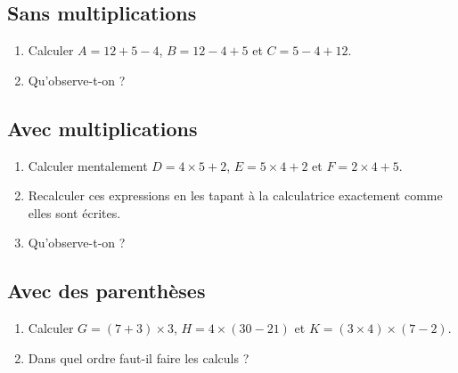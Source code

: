 
\subsection*{Sans multiplications}

\begin{enumerate}
    \item
        
Calculer \( A=12+5-4\), \( B=12-4+5\) et \( C=5-4+12\).
\item
    Qu'observe-t-on ?
\end{enumerate}

\subsection*{Avec multiplications}

\begin{enumerate}
    \item
        Calculer mentalement \( D=4\times 5+2\), \( E=5\times 4+2\) et \( F=2\times 4+5\).
    \item
        Recalculer ces expressions en les tapant à la calculatrice exactement comme elles sont écrites.
    \item
        Qu'observe-t-on ?
\end{enumerate}

\subsection*{Avec des parenthèses}

\begin{enumerate}
    \item
        Calculer \( G=(7+3)\times 3\), \( H=4\times (30-21)\) et \( K=(3\times 4)\times (7-2)\).
    \item
        Dans quel ordre faut-il faire les calculs ?
\end{enumerate}
